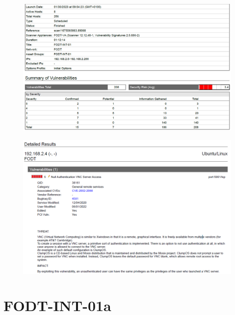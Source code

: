 \documentclass[target=bach,aauheader=]{thud}
\begin{document}
\begin{figure}[h]
    \centering
    \includegraphics[width=1\linewidth]{images/FODT-INT-01_1.png}
    \caption{}
    \label{fig:fodt-int-01_1}
\end{figure}

\pagebreak

\begin{figure}[h]
    \centering
    \includegraphics[width=1\linewidth]{images/FODT-INT-01_2.png}
    \caption{}
    \label{fig:fodt-int-01_2}
\end{figure}

\pagebreak

\section{FODT-INT-01a}
\end{document}
